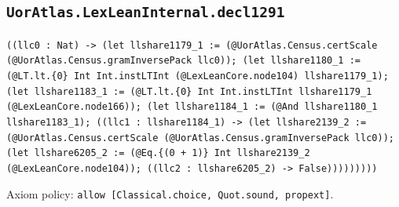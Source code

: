 \documentclass[11pt]{article}
\begin{document}
\subsection*{\texttt{UorAtlas.LexLeanInternal.decl1291}}
\noindent\texttt{((llc0 : Nat) -> (let llshare1179\_1 := (@UorAtlas.Census.certScale (@UorAtlas.Census.gramInversePack llc0)); (let llshare1180\_1 := (@LT.lt.\{0\} Int Int.instLTInt (@LexLeanCore.node104) llshare1179\_1); (let llshare1183\_1 := (@LT.lt.\{0\} Int Int.instLTInt llshare1179\_1 (@LexLeanCore.node166)); (let llshare1184\_1 := (@And llshare1180\_1 llshare1183\_1); ((llc1 : llshare1184\_1) -> (let llshare2139\_2 := (@UorAtlas.Census.certScale (@UorAtlas.Census.gramInversePack llc0)); (let llshare6205\_2 := (@Eq.\{(0 + 1)\} Int llshare2139\_2 (@LexLeanCore.node104)); ((llc2 : llshare6205\_2) -> False)))))))))}\par
\noindent Axiom policy: \texttt{allow [Classical.choice, Quot.sound, propext]}.\par
\end{document}
